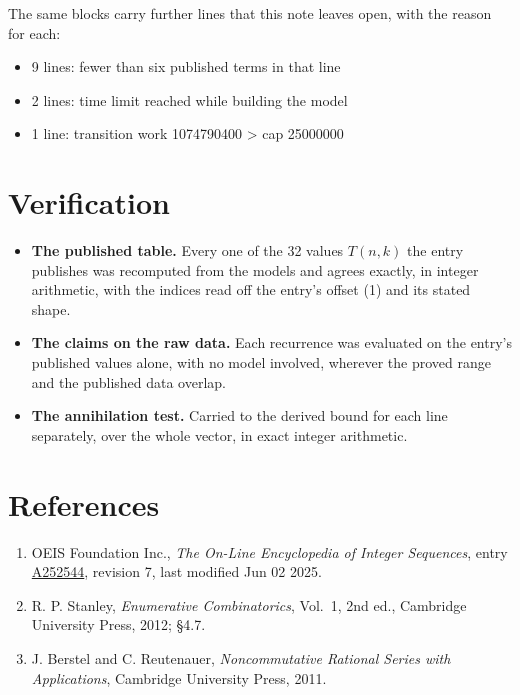 \documentclass[11pt]{article}
\theoremstyle{definition}
\begin{document}
The same blocks carry further lines that this note leaves open, with the reason for each:

\begin{itemize}

\item 9 lines: fewer than six published terms in that line

\item 2 lines: time limit reached while building the model

\item 1 line: transition work 1074790400 > cap 25000000

\end{itemize}

\section{Verification}

\begin{itemize}

\item {\bfseries The published table.} Every one of the 32 values $T(n,k)$ the entry publishes was recomputed from the models and agrees exactly, in integer arithmetic, with the indices read off the entry's offset (1) and its stated shape.

\item {\bfseries The claims on the raw data.} Each recurrence was evaluated on the entry's published values alone, with no model involved, wherever the proved range and the published data overlap.

\item {\bfseries The annihilation test.} Carried to the derived bound for each line separately, over the whole vector, in exact integer arithmetic.

\end{itemize}

\section{References}

\begin{enumerate}

\item OEIS Foundation Inc., \emph{The On-Line Encyclopedia of Integer Sequences}, entry \href{https://oeis.org/A252544}{A252544}, revision 7, last modified Jun 02 2025.

\item R. P. Stanley, \emph{Enumerative Combinatorics}, Vol.~1, 2nd ed., Cambridge University Press, 2012; \S4.7.

\item J. Berstel and C. Reutenauer, \emph{Noncommutative Rational Series with Applications}, Cambridge University Press, 2011.

\end{enumerate}
\end{document}
